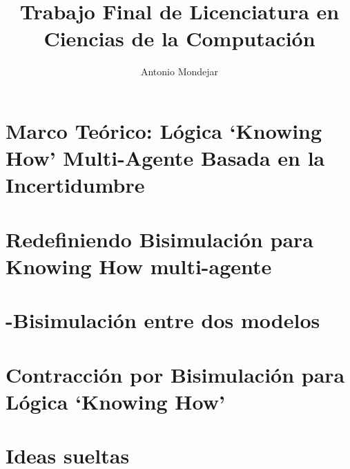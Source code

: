 \documentclass[a4paper,10pt]{article}
\begin{document}
\title{Trabajo Final de Licenciatura en Ciencias de la Computación}

\author{Antonio Mondejar}

\maketitle

\section{Marco Teórico: Lógica `Knowing How' Multi-Agente Basada en la Incertidumbre}
    

\section{Redefiniendo Bisimulación para Knowing How multi-agente}
    

\section{\KHilogic-Bisimulación entre dos modelos}
    
        
\section{Contracción por Bisimulación para Lógica `Knowing How'}
    

\section{Ideas sueltas}
    




\end{document}
